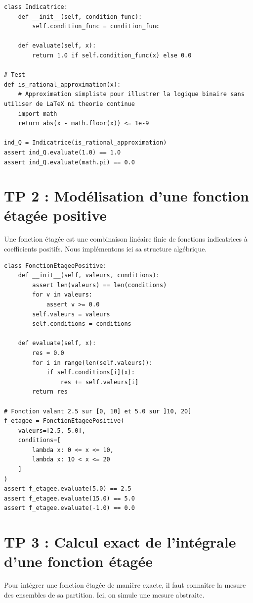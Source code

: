 \documentclass[11pt,a4paper]{article}
\begin{document}
\begin{lstlisting}
class Indicatrice:
    def __init__(self, condition_func):
        self.condition_func = condition_func

    def evaluate(self, x):
        return 1.0 if self.condition_func(x) else 0.0

# Test
def is_rational_approximation(x):
    # Approximation simpliste pour illustrer la logique binaire sans utiliser de LaTeX ni theorie continue
    import math
    return abs(x - math.floor(x)) <= 1e-9

ind_Q = Indicatrice(is_rational_approximation)
assert ind_Q.evaluate(1.0) == 1.0
assert ind_Q.evaluate(math.pi) == 0.0
\end{lstlisting}


\section{TP 2 : Modélisation d'une fonction étagée positive}

Une fonction étagée est une combinaison linéaire finie de fonctions indicatrices à coefficients positifs. Nous implémentons ici sa structure algébrique.

\begin{lstlisting}
class FonctionEtageePositive:
    def __init__(self, valeurs, conditions):
        assert len(valeurs) == len(conditions)
        for v in valeurs:
            assert v >= 0.0
        self.valeurs = valeurs
        self.conditions = conditions

    def evaluate(self, x):
        res = 0.0
        for i in range(len(self.valeurs)):
            if self.conditions[i](x):
                res += self.valeurs[i]
        return res

# Fonction valant 2.5 sur [0, 10] et 5.0 sur ]10, 20]
f_etagee = FonctionEtageePositive(
    valeurs=[2.5, 5.0],
    conditions=[
        lambda x: 0 <= x <= 10,
        lambda x: 10 < x <= 20
    ]
)
assert f_etagee.evaluate(5.0) == 2.5
assert f_etagee.evaluate(15.0) == 5.0
assert f_etagee.evaluate(-1.0) == 0.0
\end{lstlisting}


\section{TP 3 : Calcul exact de l'intégrale d'une fonction étagée}

Pour intégrer une fonction étagée de manière exacte, il faut connaître la mesure des ensembles de sa partition. Ici, on simule une mesure abstraite.
\end{document}
